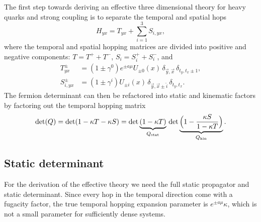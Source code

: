The first step towards deriving an effective three dimensional theory for heavy
quarks and strong coupling is to separate the temporal and spatial hops
%
\begin{equation}
  H_{yx} = T_{yx} + \sum_{i=1}^3 S_{i,yx},
\end{equation}
%
where the temporal and spatial hopping matrices are divided into positive and
negative components: $T = T^+ + T^-$, $S_i = S_i^+ + S_i^-$, and
%
\begin{align}
  T^{\pm}_{yx} &= (1 \pm \gamma^{0}) e^{\pm a\mu} U_{\pm 0}(x)\,
    \delta_{\vec{y},\vec{x}} \, \delta_{t_y, t_x\pm1},\\
  S_{i,yx}^{\pm} &= (1\pm \gamma^i) U_{\pm i}(x) \,
    \delta_{\vec{y},\vec{x}\pm\hat{i}} \,\delta_{t_y,t_x}.
\end{align}
%
The fermion determinant can then be refactored into static and kinematic factors
by factoring out the temporal hopping matrix
%
\begin{equation}
  \det (Q) = \det (1 - \kappa T - \kappa S)
   = \det\underbrace{(1 - \kappa T)}_{Q_{\text{stat}}} \,
   \det \underbrace{\Big(1 - \frac{\kappa S}{1 - \kappa
       T}\Big)}_{Q_{\text{kin}}}.
\end{equation}

\subsection{Static determinant}

For the derivation of the effective theory we need the full static propagator
and static determinant. Since every hop in the temporal direction come with a
fugacity factor, the true temporal hopping expansion parameter is $e^{\pm a\mu}
\kappa$, which is not a small parameter for sufficiently dense systems. 

